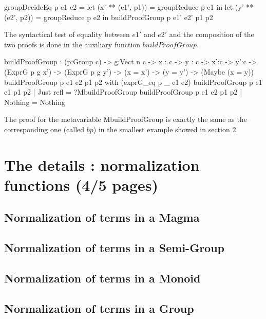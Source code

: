 \documentclass{sigplanconf}
\begin{document}
\begin{code}[caption=Decides if two elements of a group are equal, captionpos=b, label=lst1:haskell2]
groupDecideEq p e1 e2 =
  let (x' ** (e1', p1)) = 
    groupReduce p e1 in
  let (y' ** (e2', p2)) = 
    groupReduce p e2 in
	     buildProofGroup p e1' e2' p1 p2
\end{code}

The syntactical test of equality between $e1'$ and $e2'$ and the composition of the two proofs is done in the auxiliary function $buildProofGroup$. 

\begin{code}[caption=Composes the two proofs if the NF are the same, captionpos=b, label=lst1:haskell2]
buildProofGroup : (p:Group c) -> {g:Vect n c} 
  -> {x : c} -> {y : c} 
  -> {x':c} -> {y':c} 
  -> (ExprG p g x') 
  -> (ExprG p g y') 
  -> (x = x') -> (y = y') 
  -> (Maybe (x = y))
buildProofGroup p e1 e2 p1 p2 
       with (exprG_eq p _ e1 e2)
	buildProofGroup p e1 e1 p1 p2 | Just refl = 
	         ?MbuildProofGroup
	buildProofGroup p e1 e2 p1 p2 | Nothing =
	          Nothing
\end{code}

The proof for the metavariable MbuildProofGroup is exactly the same as the corresponding one (called $bp$) in the smallest example showed in section 2.


\section {The details : normalization functions (4/5 pages)}

	\subsection {Normalization of terms in a Magma}

	\subsection {Normalization of terms in a Semi-Group}

	\subsection {Normalization of terms in a Monoid}

	\subsection {Normalization of terms in a Group}
\end{document}
